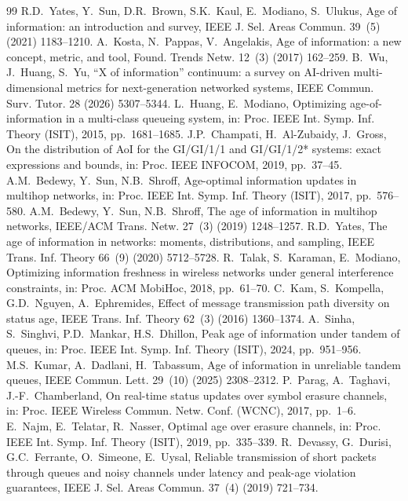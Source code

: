 \documentclass[twocolumn,3p,times,procedia]{elsarticle}
\theoremstyle{plain}
\theoremstyle{remark}
\begin{document}
\begin{thebibliography}{99}
R.D.~Yates, Y.~Sun, D.R.~Brown, S.K.~Kaul, E.~Modiano, S.~Ulukus, Age of information: an introduction and survey, IEEE J. Sel. Areas Commun. 39~(5) (2021) 1183--1210.
A.~Kosta, N.~Pappas, V.~Angelakis, Age of information: a new concept, metric, and tool, Found. Trends Netw. 12~(3) (2017) 162--259.
B.~Wu, J.~Huang, S.~Yu, ``X of information'' continuum: a survey on AI-driven multi-dimensional metrics for next-generation networked systems, IEEE Commun. Surv. Tutor. 28 (2026) 5307--5344.
L.~Huang, E.~Modiano, Optimizing age-of-information in a multi-class queueing system, in: Proc. IEEE Int. Symp. Inf. Theory (ISIT), 2015, pp.~1681--1685.
J.P.~Champati, H.~Al-Zubaidy, J.~Gross, On the distribution of AoI for the GI/GI/1/1 and GI/GI/1/2* systems: exact expressions and bounds, in: Proc. IEEE INFOCOM, 2019, pp.~37--45.
A.M.~Bedewy, Y.~Sun, N.B.~Shroff, Age-optimal information updates in multihop networks, in: Proc. IEEE Int. Symp. Inf. Theory (ISIT), 2017, pp.~576--580.
A.M.~Bedewy, Y.~Sun, N.B.~Shroff, The age of information in multihop networks, IEEE/ACM Trans. Netw. 27~(3) (2019) 1248--1257.
R.D.~Yates, The age of information in networks: moments, distributions, and sampling, IEEE Trans. Inf. Theory 66~(9) (2020) 5712--5728.
R.~Talak, S.~Karaman, E.~Modiano, Optimizing information freshness in wireless networks under general interference constraints, in: Proc. ACM MobiHoc, 2018, pp.~61--70.
C.~Kam, S.~Kompella, G.D.~Nguyen, A.~Ephremides, Effect of message transmission path diversity on status age, IEEE Trans. Inf. Theory 62~(3) (2016) 1360--1374.
A.~Sinha, S.~Singhvi, P.D.~Mankar, H.S.~Dhillon, Peak age of information under tandem of queues, in: Proc. IEEE Int. Symp. Inf. Theory (ISIT), 2024, pp.~951--956.
M.S.~Kumar, A.~Dadlani, H.~Tabassum, Age of information in unreliable tandem queues, IEEE Commun. Lett. 29~(10) (2025) 2308--2312.
P.~Parag, A.~Taghavi, J.-F.~Chamberland, On real-time status updates over symbol erasure channels, in: Proc. IEEE Wireless Commun. Netw. Conf. (WCNC), 2017, pp.~1--6.
E.~Najm, E.~Telatar, R.~Nasser, Optimal age over erasure channels, in: Proc. IEEE Int. Symp. Inf. Theory (ISIT), 2019, pp.~335--339.
R.~Devassy, G.~Durisi, G.C.~Ferrante, O.~Simeone, E.~Uysal, Reliable transmission of short packets through queues and noisy channels under latency and peak-age violation guarantees, IEEE J. Sel. Areas Commun. 37~(4) (2019) 721--734.

\end{thebibliography}
\end{document}
